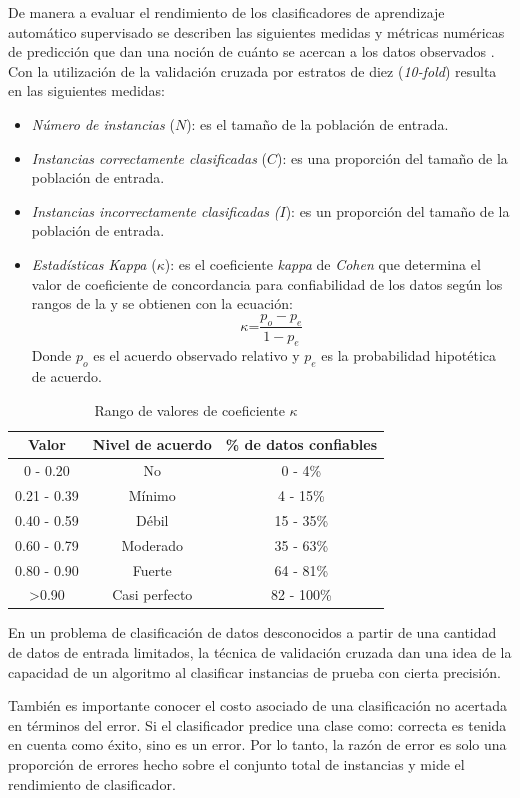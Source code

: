 De manera a evaluar el rendimiento de los clasificadores de aprendizaje
automático supervisado se describen las siguientes medidas y métricas
numéricas de predicción que dan una noción de cuánto se acercan a
los datos observados \cite{Witten2017}. Con la utilización de la
validación cruzada por estratos de diez (\emph{10-fold}) resulta en
las siguientes medidas:
\begin{itemize}
\item \emph{Número de instancias} ($N$): es el tamaño de la población de
entrada.
\item \emph{Instancias correctamente clasificadas} ($C$): es una proporción
del tamaño de la población de entrada.
\item \emph{Instancias incorrectamente clasificadas} \emph{(}$I$): es un
proporción del tamaño de la población de entrada.
\item \emph{Estadísticas Kappa} ($\kappa$): es el coeficiente \emph{kappa}
de \emph{Cohen} que determina el valor de coeficiente de concordancia
para confiabilidad de los datos según los rangos de la 
y se obtienen con la ecuación: 
\[
\kappa\text{=}\frac{p_{o}-p_{e}}{1-p_{e}}
\]
Donde $p_{o}$ es el acuerdo observado relativo y $p_{e}$ es la probabilidad
hipotética de acuerdo.
\end{itemize}
\begin{table}[h]
\begin{centering}
\begin{tabular}{|c|c|c|}
\hline 
Valor & Nivel de acuerdo & \% de datos confiables\tabularnewline
\hline 
\hline 
0 - 0.20 & No & 0 - 4\%\tabularnewline
\hline 
0.21 - 0.39 & Mínimo & 4 - 15\%\tabularnewline
\hline 
0.40 - 0.59 & Débil & 15 - 35\%\tabularnewline
\hline 
0.60 - 0.79 & Moderado & 35 - 63\%\tabularnewline
\hline 
0.80 - 0.90 & Fuerte & 64 - 81\%\tabularnewline
\hline 
>0.90 & Casi perfecto & 82 - 100\%\tabularnewline
\hline 
\end{tabular}
\par\end{centering}
\caption{\label{tab6:kappa-coef}Rango de valores de coeficiente $\kappa$}
\end{table}

En un problema de clasificación de datos desconocidos a partir de
una cantidad de datos de entrada limitados, la técnica de validación
cruzada dan una idea de la capacidad de un algoritmo al clasificar
instancias de prueba con cierta precisión. 

También es importante conocer el costo asociado de una clasificación
no acertada en términos del error. Si el clasificador predice una
clase como: correcta es tenida en cuenta como éxito, sino es un error.
Por lo tanto, la razón de error es solo una proporción de errores
hecho sobre el conjunto total de instancias y mide el rendimiento
de clasificador. 

